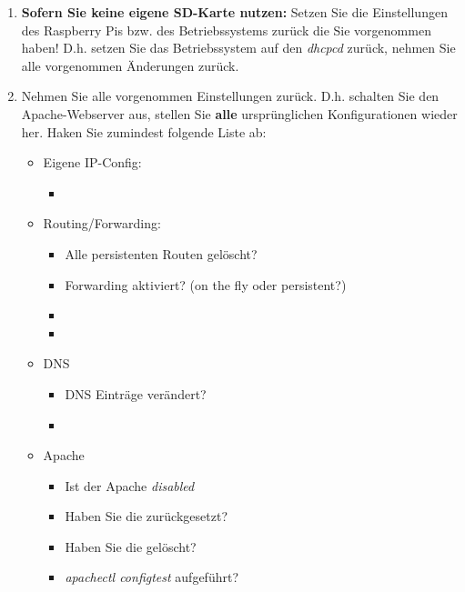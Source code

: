 \documentclass[paper=a4,fontsize=11pt]{scrartcl}%
\numberwithin{equation}{section}
\begin{document}
\begin{enumerate}
	\item \textbf{Sofern Sie keine eigene SD-Karte nutzen:} Setzen Sie die Einstellungen des Raspberry Pis bzw. des Betriebssystems zurück die Sie vorgenommen haben! D.h. setzen Sie das Betriebssystem auf den \emph{dhcpcd} zurück, nehmen Sie alle vorgenommen Änderungen zurück.
	\item Nehmen Sie alle vorgenommen Einstellungen zurück. D.h. schalten Sie den Apache-Webserver aus, stellen Sie \textbf{alle} ursprünglichen Konfigurationen wieder her. Haken Sie zumindest folgende Liste ab:
	\begin{itemize}
	\item Eigene IP-Config:
	\begin{itemize}
		\item {}
	\end{itemize}
	\item Routing/Forwarding:
	\begin{itemize}
		\item Alle persistenten Routen gelöscht?
		\item Forwarding aktiviert? (on the fly oder persistent?)
		\item {}
		\item {}
	\end{itemize}
	\item DNS
	\begin{itemize}
		\item DNS Einträge verändert?
		\item {}
	\end{itemize}
	\item Apache
	\begin{itemize}
		\item Ist der Apache \emph{disabled}
		\item Haben Sie die  zurückgesetzt?
		\item Haben Sie die  gelöscht?
		\item \emph{apachectl configtest} aufgeführt?
	\end{itemize}
\end{itemize}
\end{enumerate}
\end{document}
